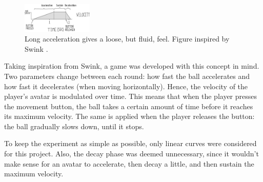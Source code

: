\begin{figure}[htbp]
\centering
\includegraphics[width=0.30\textwidth]{Pics/adsr_loose}
\caption{Long acceleration gives a loose, but fluid, feel. Figure inspired by Swink \cite{swink}.}
\label{fig:adsr_loose}
\end{figure}

Taking inspiration from Swink, a game was developed with this concept in mind. Two parameters change between each round: how fast the ball accelerates and how fast it decelerates (when moving horizontally). Hence, the velocity of the player's avatar is modulated over time. This means that when the player presses the movement button, the ball takes a certain amount of time before it reaches its maximum velocity. The same is applied when the player releases the button: the ball gradually slows down, until it stops.

To keep the experiment as simple as possible, only linear curves were considered for this project. Also, the decay phase was deemed unnecessary, since it wouldn't make sense for an avatar to accelerate, then decay a little, and then sustain the maximum velocity.



